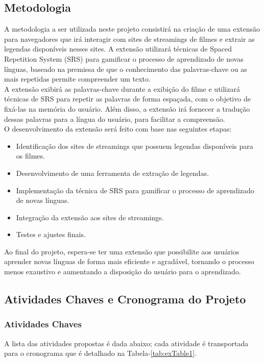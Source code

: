 \documentclass[12pt]{article}
\begin{document}
\subsection{Metodologia}
A metodologia a ser utilizada neste projeto consistirá na criação de uma extensão para navegadores que irá interagir com sites de streamings de filmes e extrair as legendas disponíveis nesses sites. A extensão utilizará técnicas de Spaced Repetition System (SRS) para gamificar o processo de aprendizado de novas línguas, baseado na premissa de que o conhecimento das palavras-chave ou as mais repetidas permite compreender um texto. 
\\
A extensão exibirá as palavras-chave durante a exibição do filme e utilizará técnicas de SRS para repetir as palavras de forma espaçada, com o objetivo de fixá-las na memória do usuário. Além disso, a extensão irá fornecer a tradução dessas palavras para a língua do usuário, para facilitar a compreensão.
\\
O desenvolvimento da extensão será feito com base nas seguintes etapas:
\begin{itemize}
\item Identificação dos sites de streamings que possuem legendas disponíveis para os filmes.
\item Desenvolvimento de uma ferramenta de extração de legendas.
\item Implementação da técnica de SRS para gamificar o processo de aprendizado de novas línguas.
\item Integração da extensão aos sites de streamings.
\item Testes e ajustes finais.
\end{itemize}
Ao final do projeto, espera-se ter uma extensão que possibilite aos usuários aprender novas línguas de forma mais eficiente e agradável, tornando o processo menos exaustivo e aumentando a disposição do usuário para o aprendizado.

\subsection{Atividades Chaves e Cronograma do Projeto}
\subsubsection{Atividades Chaves}

A lista das atividades propostas é dada abaixo; cada atividade é transportada para o cronograma que é detalhado na Tabela-\ref{tab:exTable1}.
\end{document}
